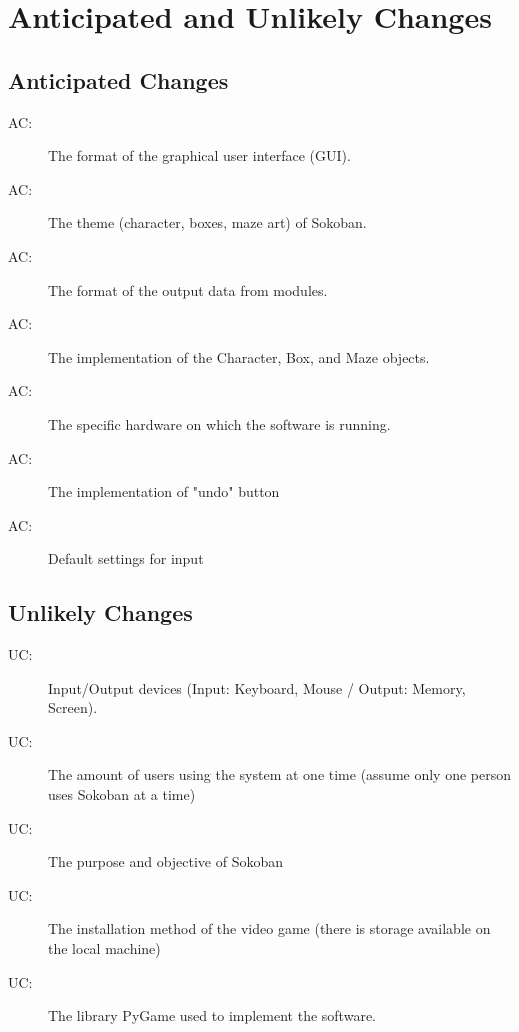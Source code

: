 \documentclass[12pt, titlepage]{article}
\newcounter{acnum}
\newcommand{\actheacnum}{AC\theacnum}
\newcounter{ucnum}
\newcommand{\uctheucnum}{UC\theucnum}
\begin{document}
\section{Anticipated and Unlikely Changes} \label{SecChange}

\subsection{Anticipated Changes} \label{SecAchange}

\begin{description}
    \item [ \actheacnum \label{ac1}:] The format of the graphical user interface (GUI).
    \item [ \actheacnum \label{ac2}:] The theme (character, boxes, maze art) of Sokoban.
    \item [ \actheacnum \label{ac3}:] The format of the output data from modules.
    \item [ \actheacnum \label{ac4}:] The implementation of the Character, Box, and Maze objects.
    \item [ \actheacnum \label{ac5}:] The specific hardware on which the software is running.
    \item [ \actheacnum \label{ac6}:] The implementation of "undo" button
    \item [ \actheacnum \label{ac7}:] Default settings for input
\end{description}

\subsection{Unlikely Changes} \label{SecUchange}

\begin{description}
    \item [ \uctheucnum \label{uc1}:] Input/Output devices (Input: Keyboard, Mouse / Output: Memory, Screen).
    \item [ \uctheucnum \label{uc2}:] The amount of users using the system at one time (assume only one person uses Sokoban at a time)
    \item [ \uctheucnum \label{uc3}:] The purpose and objective of Sokoban
    \item [ \uctheucnum \label{uc4}:] The installation method of the video game (there is storage available on the local machine)
    \item [ \uctheucnum \label{uc5}:] The library PyGame used to implement the software.
\end{description}
\end{document}
